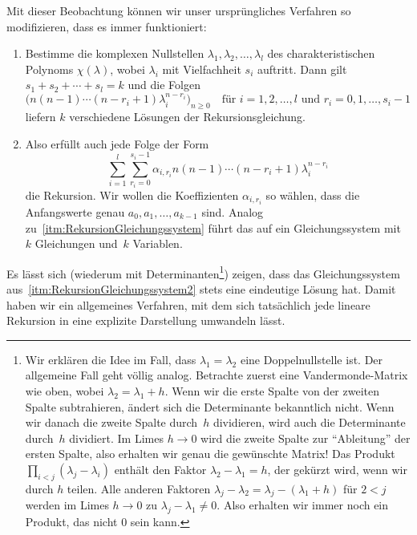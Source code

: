 Mit dieser Beobachtung können wir unser ursprüngliches Verfahren so modifizieren, dass es immer funktioniert:
\begin{enumerate}[label={$(\alph*')$},ref={$(\alph*')$}]\itshape
	\item \label{itm:CharakteristischesPolynom2}Bestimme die komplexen Nullstellen $\lambda_1,\lambda_2,\dotsc,\lambda_l$ des charakteristischen Polynoms $\chi(\lambda)$, wobei $\lambda_i$ mit Vielfachheit $s_i$ auftritt. Dann gilt $s_1+s_2+\dotsb+s_l=k$ und die Folgen
	\begin{equation*}
		\bigl(n(n-1)\dotsm(n-r_i+1)\lambda_i^{n-r_i}\bigr)_{n\geqslant 0}\quad\text{für }i=1,2,\dotsc,l\text{ und }r_i=0,1,\dotsc,s_i-1
	\end{equation*}
	liefern $k$ verschiedene Lösungen der Rekursionsgleichung.
	\item \label{itm:RekursionGleichungssystem2}Also erfüllt auch jede Folge der Form
	\begin{equation*}
		\sum_{i=1}^l\sum_{r_i=0}^{s_i-1}\alpha_{i,r_i}n(n-1)\dotsm(n-r_i+1)\lambda_i^{n-r_i}
	\end{equation*}
	die Rekursion. Wir wollen die Koeffizienten $\alpha_{i,r_i}$ so wählen, dass die Anfangswerte genau $a_0,a_1,\dotsc,a_{k-1}$ sind. Analog zu~\ref{itm:RekursionGleichungssystem} führt das auf ein Gleichungssystem mit~$k$ Gleichungen und~$k$ Variablen.
\end{enumerate}
Es lässt sich (wiederum mit Determinanten\footnote{Wir erklären die Idee im Fall, dass $\lambda_1=\lambda_2$ eine Doppelnullstelle ist. Der allgemeine Fall geht völlig analog. Betrachte zuerst eine Vandermonde-Matrix wie oben, wobei $\lambda_2=\lambda_1+h$. Wenn wir die erste Spalte von der zweiten Spalte subtrahieren, ändert sich die Determinante bekanntlich nicht. Wenn wir danach die zweite Spalte durch~$h$ dividieren, wird auch die Determinante durch~$h$ dividiert. Im Limes $h\rightarrow 0$ wird die zweite Spalte zur \enquote{Ableitung} der ersten Spalte, also erhalten wir genau die gewünschte Matrix! Das Produkt $\prod_{i<j}(\lambda_j-\lambda_i)$ enthält den Faktor $\lambda_2-\lambda_1=h$, der gekürzt wird, wenn wir durch $h$ teilen. Alle anderen Faktoren $\lambda_j-\lambda_2=\lambda_j-(\lambda_1+h)$ für $2<j$ werden im Limes $h\rightarrow 0$ zu $\lambda_j-\lambda_1\neq 0$. Also erhalten wir immer noch ein Produkt, das nicht $0$ sein kann.}) zeigen, dass das Gleichungssystem aus~\ref{itm:RekursionGleichungssystem2} stets eine eindeutige Lösung hat. Damit haben wir ein allgemeines Verfahren, mit dem sich tatsächlich jede lineare Rekursion in eine explizite Darstellung umwandeln lässt.

